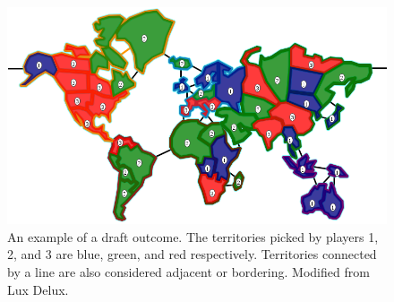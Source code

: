 \documentclass[letterpaper]{article}
\numberwithin{equation}{section}
\numberwithin{theorem}{section}
\numberwithin{lemma}{section}
\numberwithin{df}{section}
\begin{document}

\begin{figure}[t]
	\centering
	\includegraphics[scale=0.3]{../ForPublication/figs/DraftExample.png}
	\caption{An example of a draft outcome.  The territories picked by players 1, 2, and 3 are blue, green, and red respectively.  Territories connected by a line are also considered adjacent or bordering. 
	Modified from Lux Delux.}
	\label{fig:DraftExample}
\end{figure}
\end{document}
